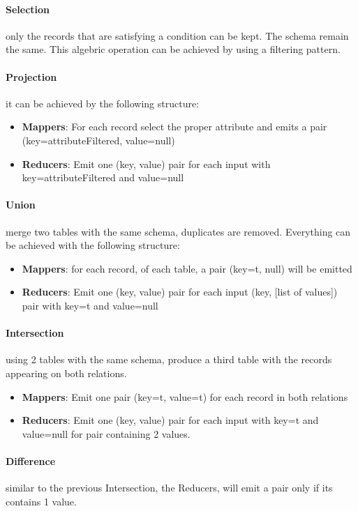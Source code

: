 \documentclass[12pt]{article}
\begin{document}
\paragraph{Selection} only the records that are satisfying a condition can be kept. The schema remain the same. This algebric operation can be achieved by using a filtering pattern.

\paragraph{Projection} it can be achieved by the following structure:
\begin{itemize}
  \item \textbf{Mappers}: For each record select the proper attribute and emits a pair (key=attributeFiltered, value=null)
  \item \textbf{Reducers}: Emit one (key, value) pair for each input with key=attributeFiltered and value=null
\end{itemize}
\paragraph{Union} merge two tables with the same schema, duplicates are removed. Everything can be achieved with the following structure:
\begin{itemize}
  \item \textbf{Mappers}: for each record, of each table, a pair (key=t, null) will be emitted
  \item \textbf{Reducers}: Emit one (key, value) pair for each input (key, [list of values]) pair with key=t and value=null
\end{itemize}

\paragraph{Intersection} using 2 tables with the same schema, produce a third table with the records appearing on both relations.
\begin{itemize}
  \item \textbf{Mappers}: Emit one pair (key=t, value=t) for each record in both relations
  \item \textbf{Reducers}: Emit one (key, value) pair for each input with key=t and value=null for pair containing 2 values.
\end{itemize}

\paragraph{Difference} similar to the previous Intersection, the Reducers, will emit a pair only if its contains 1 value.
\end{document}
